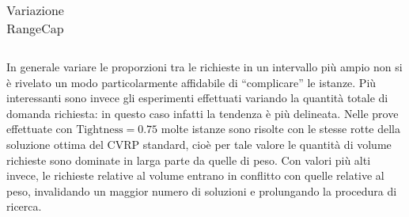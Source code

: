 \documentclass[11pt,oneside,a4paper]{article}
\begin{document}
\begin{table}
\begin{tabular}{|l|r|r|r|}
\hline
\end{tabular}
\caption{Variazione RangeCap}\label{t_supp1}
\end{table}

In generale variare le proporzioni tra le richieste in un intervallo più ampio non si è rivelato un modo
particolarmente affidabile di ``complicare'' le istanze.
Più interessanti sono invece gli esperimenti effettuati variando la quantità
totale di domanda richiesta: in questo caso infatti la tendenza è più delineata. Nelle prove effettuate
con $\text{Tightness}=0.75$ molte istanze sono risolte con le stesse rotte della soluzione ottima del CVRP
standard, cioè per tale valore le quantità di volume richieste sono dominate in larga parte da quelle di
peso. Con valori più alti invece, le richieste relative al volume entrano in conflitto con quelle relative al
peso, invalidando un maggior numero di soluzioni e prolungando la procedura di ricerca.
\end{document}
